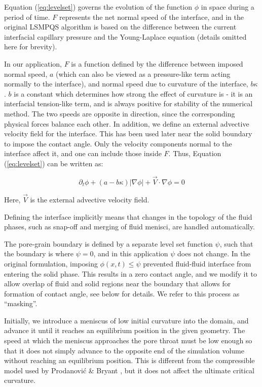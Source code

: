 Equation (\ref{eq:levelset}) governs the evolution of the function $\phi$ in space during a period of time. $F$ represents the net normal speed of the interface, and in the original LSMPQS algorithm is based on the difference between the current interfacial capillary pressure and the Young-Laplace equation (details omitted here for brevity). 

In our application, $F$ is a function defined by the difference between imposed normal speed, $a$ (which can also be viewed as a pressure-like term acting normally to the interface), and normal speed due to curvature of the interface, $b\kappa$. $b$ is a constant which determines how strong the effect of curvature is - it is an interfacial tension-like term, and is always positive for stability of the numerical method. The two speeds are opposite in direction, since the corresponding physical forces balance each other. In addition, we define an external advective velocity field for the interface. This has been used later near the solid boundary to impose the contact angle. Only the velocity components normal to the interface affect it, and one can include those inside $F$. Thus, Equation (\ref{eq:levelset}) can be written as:

\begin{equation} 
		\label{eq:levelset_2}
		\partial_t\phi + (a-b\kappa)|\nabla\phi|+\vec{V}\cdot\nabla\phi = 0
\end{equation}

Here, $\vec{V}$ is the external advective velocity field.

Defining the interface implicitly means that changes in the topology of the fluid phases, such as snap-off and merging of fluid menisci, are handled automatically.

The pore-grain boundary is defined by a separate level set function $\psi$, such that the boundary is where $\psi=0$, and in this application $\psi$ does not change. In the original formulation, imposing $\phi(x,t)\leq\psi$ prevented fluid-fluid interface from entering the solid phase. This results in a zero contact angle, and we modify it to allow overlap of fluid and solid regions near the boundary that allows for formation of contact angle, see below for details. We refer to this process as ``masking''.

Initially, we introduce a meniscus of low initial curvature into the domain, and advance it until it reaches an equilibrium position in the given geometry. The speed at which the meniscus approaches the pore throat must be low enough so that it does not simply advance to the opposite end of the simulation volume without reaching an equilibrium position. This is different from the compressible model used by Prodanovi\'{c} \& Bryant \cite{prodanovic_porous_2006}, but it does not affect the ultimate critical curvature.

